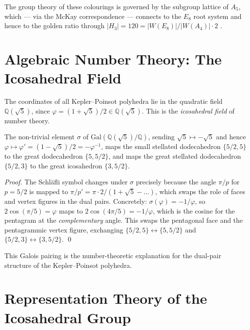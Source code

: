 The group theory of these colourings is governed by the
subgroup lattice of $A_5$, which — via the McKay correspondence
— connects to the $E_8$ root system and hence to the golden
ratio through $|H_3| = 120 = |W(E_8)|/|W(A_4)| \cdot 2$
\cite{coxeter_regular_polytopes}.

\section{Algebraic Number Theory: The Icosahedral Field}
\label{sec:algebraic-number-theory}

The coordinates of all Kepler–Poinsot polyhedra lie in the
quadratic field $\mathbb{Q}(\sqrt{5})$, since $\varphi = (1+\sqrt{5})/2
\in \mathbb{Q}(\sqrt{5})$.  This is the \emph{icosahedral field}
of number theory.

\begin{proposition}
\label{prop:galois-action}
The non-trivial element $\sigma$ of $\mathrm{Gal}(\mathbb{Q}(\sqrt5)/\mathbb{Q})$,
sending $\sqrt5 \mapsto -\sqrt5$ and hence $\varphi \mapsto \varphi' = (1-\sqrt5)/2 = -\varphi^{-1}$,
maps the small stellated dodecahedron $\{5/2,5\}$ to the great
dodecahedron $\{5,5/2\}$, and maps the great stellated
dodecahedron $\{5/2,3\}$ to the great icosahedron $\{3,5/2\}$.
\end{proposition}

\begin{proof}
The Schläfli symbol changes under $\sigma$ precisely because
the angle $\pi/p$ for $p = 5/2$ is mapped to $\pi/p' = \pi\cdot 2/(1+\sqrt{5}-\ldots)$,
which swaps the role of faces and vertex figures in the dual
pairs.  Concretely: $\sigma(\varphi) = -1/\varphi$, so
$2\cos(\pi/5) = \varphi$ maps to $2\cos(4\pi/5) = -1/\varphi$,
which is the cosine for the pentagram at the
\emph{complementary} angle.  This swaps the pentagonal face
and the pentagrammic vertex figure, exchanging
$\{5/2,5\} \leftrightarrow \{5,5/2\}$ and
$\{5/2,3\} \leftrightarrow \{3,5/2\}$.
\qed
\end{proof}

This Galois pairing is the number-theoretic explanation for
the dual-pair structure of the Kepler–Poinsot polyhedra.

\section{Representation Theory of the Icosahedral Group}
\label{sec:representation-theory}

